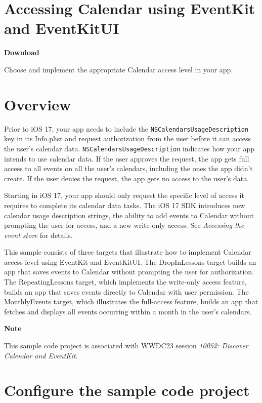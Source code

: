 \documentclass{article}
\title{}
\author{}
\date{}
\begin{document}
\section*{Accessing Calendar using EventKit and EventKitUI}

\textbf{Download}

Choose and implement the appropriate Calendar access level in your app.

\section*{Overview}

Prior to iOS 17, your app needs to include the \texttt{NSCalendarsUsageDescription} key in its Info.plist and request authorization from the user before it can access the user’s calendar data. \texttt{NSCalendarsUsageDescription} indicates how your app intends to use calendar data. If the user approves the request, the app gets full access to all events on all the user’s calendars, including the ones the app didn't create. If the user denies the request, the app gets no access to the user's data.

Starting in iOS 17, your app should only request the specific level of access it requires to complete its calendar data tasks. The iOS 17 SDK introduces new calendar usage description strings, the ability to add events to Calendar without prompting the user for access, and a new write-only access. See \textit{Accessing the event store} for details.

This sample consists of three targets that illustrate how to implement Calendar access level using EventKit and EventKitUI. The DropInLessons target builds an app that saves events to Calendar without prompting the user for authorization. The RepeatingLessons target, which implements the write-only access feature, builds an app that saves events directly to Calendar with user permission. The MonthlyEvents target, which illustrates the full-access feature, builds an app that fetches and displays all events occurring within a month in the user's calendars.

\textbf{Note}

This sample code project is associated with WWDC23 session \textit{10052: Discover Calendar and EventKit}.

\section*{Configure the sample code project}
\end{document}
